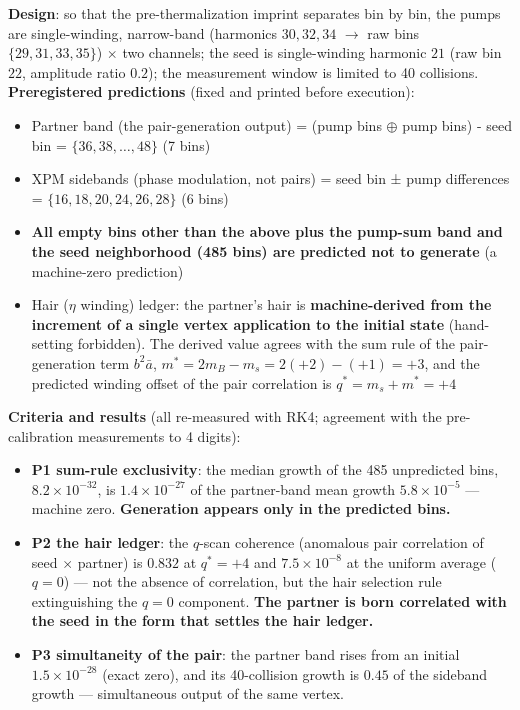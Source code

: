 \documentclass[
  a4paper,
]{article}
\providecommand{\tightlist}{%
  \setlength{\itemsep}{0pt}\setlength{\parskip}{0pt}}
\begin{document}
\textbf{Design}: so that the pre-thermalization imprint separates bin by
bin, the pumps are single-winding, narrow-band (harmonics \(30,32,34\)
\(\to\) raw bins \(\{29,31,33,35\}\)) \(\times\) two channels; the seed
is single-winding harmonic \(21\) (raw bin \(22\), amplitude ratio
\(0.2\)); the measurement window is limited to 40 collisions.
\textbf{Preregistered predictions} (fixed and printed before execution):

\begin{itemize}
\tightlist
\item
  Partner band (the pair-generation output) = (pump bins \(\oplus\) pump
  bins) - seed bin = \(\{36,38,\dots,48\}\) (7 bins)
\item
  XPM sidebands (phase modulation, not pairs) = seed bin ± pump
  differences = \(\{16,18,20,24,26,28\}\) (6 bins)
\item
  \textbf{All empty bins other than the above plus the pump-sum band and
  the seed neighborhood (485 bins) are predicted not to generate} (a
  machine-zero prediction)
\item
  Hair (\(\eta\) winding) ledger: the partner's hair is
  \textbf{machine-derived from the increment of a single vertex
  application to the initial state} (hand-setting forbidden). The
  derived value agrees with the sum rule of the pair-generation term
  \(b^2\bar a\), \(m^* = 2m_B - m_s = 2(+2)-(+1) = +3\), and the
  predicted winding offset of the pair correlation is
  \(q^* = m_s + m^* = +4\)
\end{itemize}

\textbf{Criteria and results} (all re-measured with RK4; agreement with
the pre-calibration measurements to 4 digits):

\begin{itemize}
\tightlist
\item
  \textbf{P1 sum-rule exclusivity}: the median growth of the 485
  unpredicted bins, \(8.2\times10^{-32}\), is \(1.4\times10^{-27}\) of
  the partner-band mean growth \(5.8\times10^{-5}\) --- machine zero.
  \textbf{Generation appears only in the predicted bins.}
\item
  \textbf{P2 the hair ledger}: the \(q\)-scan coherence (anomalous pair
  correlation of seed \(\times\) partner) is \(0.832\) at \(q^*=+4\) and
  \(7.5\times10^{-8}\) at the uniform average (\(q=0\)) --- not the
  absence of correlation, but the hair selection rule extinguishing the
  \(q=0\) component. \textbf{The partner is born correlated with the
  seed in the form that settles the hair ledger.}
\item
  \textbf{P3 simultaneity of the pair}: the partner band rises from an
  initial \(1.5\times10^{-28}\) (exact zero), and its 40-collision
  growth is \(0.45\) of the sideband growth --- simultaneous output of
  the same vertex.
\end{itemize}
\end{document}
